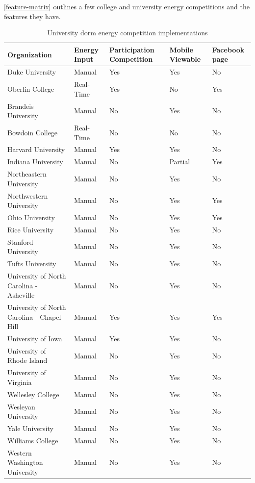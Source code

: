 \autoref{feature-matrix} outlines a few college and university energy competitions and the features they have.

\begin{table}[t!]
	\begin{tabular}{| p{5cm} || p{2cm} | p{2cm} | p{2cm} | p{2cm} |}
		\hline
		Organization & Energy Input & Participation Competition & Mobile Viewable & Facebook page \\
		\hline
		Duke University & Manual & Yes & Yes & No \\
		Oberlin College & Real-Time & Yes & No & Yes\\
		Brandeis University~\cite{brandeis} & Manual & No & Yes & No\\
		Bowdoin College~\cite{bowdoin} & Real-Time & No & No & No\\
		Harvard University & Manual & Yes & Yes & No\\
		Indiana University~\cite{indiana-energychallenge} & Manual & No & Partial & Yes\\
		Northeastern University~\cite{northeastern} & Manual & No & Yes & No\\
		Northwestern University~\cite{northwestern} & Manual & No & Yes & Yes \\
		Ohio University~\cite{ohio-reschallenge} & Manual & No & Yes & Yes\\
		Rice University~\cite{rice-sustainability} & Manual & No & Yes & No\\
		Stanford University~\cite{stanford-energybowl} & Manual & No & Yes & No \\
		Tufts University~\cite{tufts-competition} & Manual & No & Yes & No \\
		University of North Carolina - Asheville~\cite{unc-asheville} & Manual & No & Yes & No \\
		University of North Carolina - Chapel Hill~\cite{unc-chapelhill} & Manual & Yes & Yes & Yes \\
		University of Iowa~\cite{iowa-sturrier} & Manual & Yes & Yes & No \\
		University of Rhode Island~\cite{greenuri} & Manual & No & Yes & No \\
		University of Virginia~\cite{virginia} & Manual & No & Yes & No \\
		Wellesley College~\cite{wellesley} & Manual & No & Yes & No \\
		Wesleyan University~\cite{wesleyan} & Manual & No & Yes & No \\
		Yale University~\cite{yale-greencup} & Manual & No & Yes & No \\
		Williams College~\cite{williams} & Manual & No & Yes & No \\
		Western Washington University~\cite{wwu-goforthegreen} & Manual & No & Yes & No \\
		\hline
	\end{tabular}
	\caption{University dorm energy competition implementations}
	\label{feature-matrix}
\end{table}

